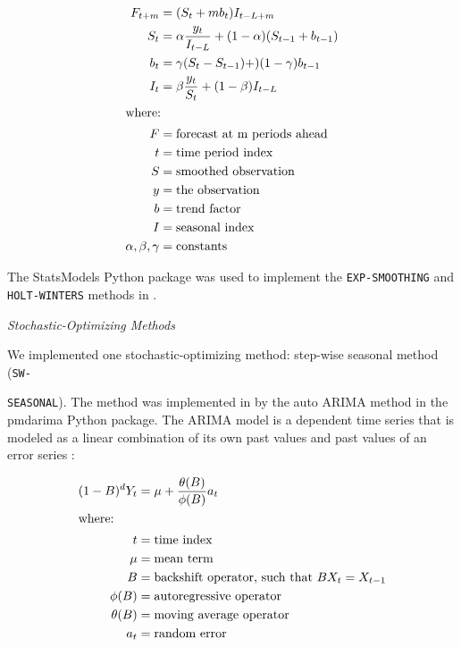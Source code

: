 \begin{align}
    F_{t+m} &= (S_t +mb_t)I_{t-L+m} \\
    S_t &= \alpha \frac{y_t}{I_{t-L}}+(1-\alpha)(S_{t-1}+b_{t-1}) \nonumber \\
    b_t &= \gamma(S_t-S_{t-1})+)(1-\gamma)b_{t-1} \nonumber \\
    I_t &= \beta \frac{y_t}{S_t} + (1-\beta)I_{t-L} \nonumber \\
    \intertext{where:}
    F &= \mbox{forecast at m periods ahead} \nonumber \\
    t &= \mbox{time period index} \nonumber \\
    S &= \mbox{smoothed observation} \nonumber \\
    y &= \mbox{the observation} \nonumber \\
    b &= \mbox{trend factor} \nonumber \\
    I &= \mbox{seasonal index} \nonumber \\
    \alpha, \beta, \gamma &= \mbox{constants} \nonumber
\end{align}

The StatsModels \cite{github_community_statsmodels:_2019}
Python package was used to implement the \texttt{EXP-SMOOTHING} 
and \texttt{HOLT-WINTERS} methods in \deploy. 

\noindent
\textit{Stochastic-Optimizing Methods}

We implemented one stochastic-optimizing method: step-wise 
seasonal method (\texttt{SW-}

\noindent
\texttt{SEASONAL}). 
The method was implemented in \deploy by the auto \gls{ARIMA} 
method in the pmdarima \cite{noauthor_pmdarima:_2019}
Python package. 
The \gls{ARIMA} model is a dependent time series that is 
modeled as a linear combination of its own past values 
and past values of an error series \cite{institute_sas_1985}: 

\begin{align}
    (1-B)^dY_t &= \mu + \frac{\theta(B)}{\phi(B)}a_t \\ 
    \intertext{where:}
    t &= \mbox{time index} \nonumber \\
    \mu &= \mbox{mean term} \nonumber \\
    B &= \mbox{backshift operator, such that } BX_t = X_{t-1} \nonumber \\
    \phi(B) &= \mbox{autoregressive operator} \nonumber \\
    \theta(B) &= \mbox{moving average operator} \nonumber \\
    a_t &= \mbox{random error} \nonumber 
\end{align}

